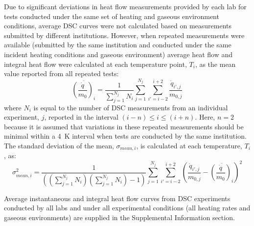 \documentclass{book}
\begin{document}
\newpage
Due to significant deviations  in heat flow measurements provided by each lab for tests conducted under the same set of heating and gaseous environment conditions, average DSC curves were not calculated based on measurements submitted by different institutions. However, when repeated measurements were available (submitted by the same institution and conducted under the same incident heating conditions and gaseous environment) average heat flow and integral heat flow were calculated at each temperature point, $T_i$, as the mean value reported from all repeated tests:
\begin{equation}
   \overline{ \left( \frac{\dot{q}}{m_0} \right)_i } = \frac{1}{\sum_{j=1}^{N_j}{N_i}} \sum_{j=1}^{N_j} \sum_{i'=i-2}^{i+2} \frac{\dot{q}_{i',j}}{m_{0,j}}
\end{equation}
where $N_i$ is equal to the number of DSC measurements from an individual experiment, $j$, reported in the interval $(i-n) \leq i \leq (i+n)$. Here, $n=2$ because it is assumed that variations in these repeated measurements should be minimal within a 4~K interval when tests are conducted by the same institution. The standard deviation of the mean, $\sigma_{mean,i}$, is calculated at each temperature, $T_i$, as:
\begin{equation}
   \sigma_{mean,i}^2 = \frac{1}{(({\sum_{j=1}^{N_j}{N_i}})({\sum_{j=1}^{N_j}{N_i}})-1)} \sum_{j=1}^{N_j} \sum_{i'=i-2}^{i+2} \left( \frac{\dot{q}_{i',j}}{m_{0,j}} - \overline{ \left( \frac{\dot{q}}{m_0} \right)_i }   \right)^2
\end{equation}


Average instantaneous and integral heat flow curves from DSC experiments conducted by all labs and under all experimental conditions (all heating rates and gaseous environments) are supplied in the Supplemental Information section.
\end{document}
